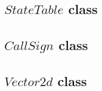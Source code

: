 \documentclass{article}
\begin{document}
\subsection{$StateTable$ class}
\label{app:StateTable}%




\newpage


\subsection{$CallSign$ class}
\label{app:CallSign}





\subsection{$Vector2d$ class}
\label{app:Vector2d}







\end{document}
